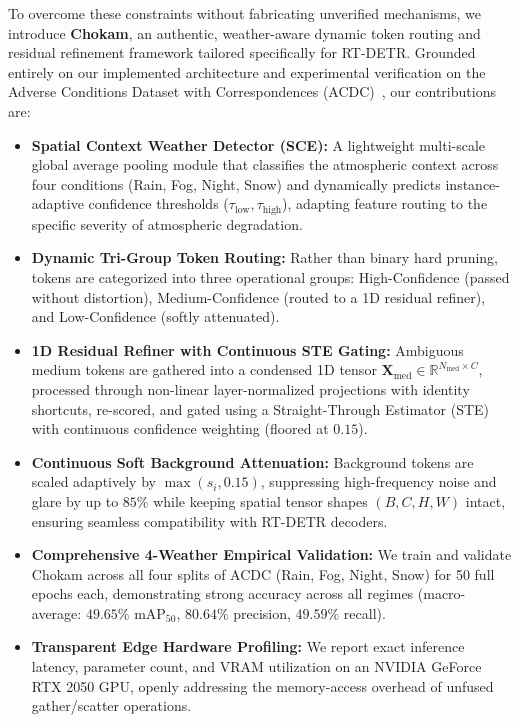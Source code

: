 \documentclass[conference]{IEEEtran}
\begin{document}
To overcome these constraints without fabricating unverified mechanisms, we introduce \textbf{Chokam}, an authentic, weather-aware dynamic token routing and residual refinement framework tailored specifically for RT-DETR. Grounded entirely on our implemented architecture and experimental verification on the Adverse Conditions Dataset with Correspondences (ACDC)~\cite{sakaridis2021acdc}, our contributions are:
\begin{itemize}
    \item \textbf{Spatial Context Weather Detector (SCE):} A lightweight multi-scale global average pooling module that classifies the atmospheric context across four conditions (Rain, Fog, Night, Snow) and dynamically predicts instance-adaptive confidence thresholds ($\tau_{\text{low}}, \tau_{\text{high}}$), adapting feature routing to the specific severity of atmospheric degradation.
    \item \textbf{Dynamic Tri-Group Token Routing:} Rather than binary hard pruning, tokens are categorized into three operational groups: High-Confidence (passed without distortion), Medium-Confidence (routed to a 1D residual refiner), and Low-Confidence (softly attenuated).
    \item \textbf{1D Residual Refiner with Continuous STE Gating:} Ambiguous medium tokens are gathered into a condensed 1D tensor $\mathbf{X}_{\text{med}} \in \mathbb{R}^{N_{\text{med}} \times C}$, processed through non-linear layer-normalized projections with identity shortcuts, re-scored, and gated using a Straight-Through Estimator (STE) with continuous confidence weighting (floored at $0.15$).
    \item \textbf{Continuous Soft Background Attenuation:} Background tokens are scaled adaptively by $\max(s_i, 0.15)$, suppressing high-frequency noise and glare by up to $85\%$ while keeping spatial tensor shapes $(B, C, H, W)$ intact, ensuring seamless compatibility with RT-DETR decoders.
    \item \textbf{Comprehensive 4-Weather Empirical Validation:} We train and validate Chokam across all four splits of ACDC (Rain, Fog, Night, Snow) for 50 full epochs each, demonstrating strong accuracy across all regimes (macro-average: $49.65\%$ $\text{mAP}_{50}$, $80.64\%$ precision, $49.59\%$ recall).
    \item \textbf{Transparent Edge Hardware Profiling:} We report exact inference latency, parameter count, and VRAM utilization on an NVIDIA GeForce RTX 2050 GPU, openly addressing the memory-access overhead of unfused gather/scatter operations.
\end{itemize}
\end{document}
